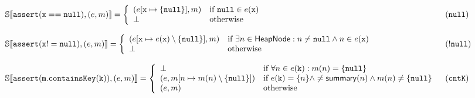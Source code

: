 \begin{figure*}
\[\begin{array}{ll}
\mathbb{S}\llbracket \mathtt{assert(x==null)}, (e, m) \rrbracket = \left\{
\begin{array}{ll}
(e[\mathtt{x} \mapsto \{\mathtt{null}\}], m) & \textrm{if } \mathtt{null} \in e(\mathtt{x})\\
\bot & \textrm{otherwise}\\
\end{array}
\right. & (\mathtt{null})\\
\\
\mathbb{S}\llbracket \mathtt{assert(x!=null)}, (e, m) \rrbracket = \left\{
\begin{array}{ll}
(e[\mathtt{x} \mapsto e(\mathtt{x}) \setminus \{\mathtt{null}\}], m) & \textrm{if } \exists n \in \mathsf{HeapNode} : n \neq \mathtt{null} \land n \in e(\mathtt{x})\\
\bot & \textrm{otherwise}\\
\end{array}
\right. & (\mathtt{!null})\\
\\
\mathbb{S}\llbracket \mathtt{assert(m.containsKey(k))}, (e, m) \rrbracket = \left\{
\begin{array}{ll}
\bot & \textrm{if } \forall n \in e(\mathtt{k}) : m(n)=\{\mathtt{null}\}\\
(e, m[n \mapsto m(n)\setminus\{\mathtt{null}\}]) & \textrm{if } e(\mathtt{k}) = \{n\} \land \neq \mathsf{summary}(n) \land m(n) \neq \{\mathtt{null}\}\\
(e, m) & \textrm{otherwise}\\
\end{array}
\right. & (\mathtt{cntK})\\

\end{array}\]
\end{figure*}
